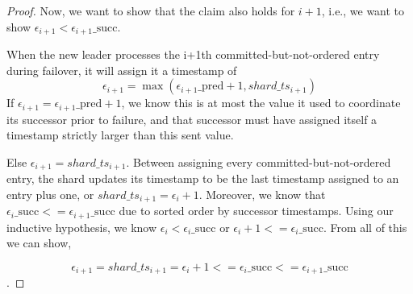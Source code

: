 \begin{proof}
Now, we want to show that the claim also holds for $i+1$, i.e., we want to show $\epsilon_{i+1} < \epsilon_{i+1}\_\text{succ}$.

When the new leader processes the i+1th committed-but-not-ordered entry during failover, it will assign it a timestamp of
$$\epsilon_{i+1} = \max(\epsilon_{i+1}\_\text{pred} + 1, shard\_ts_{i+1})$$
If $\epsilon_{i+1} = \epsilon_{i+1}\_\text{pred} + 1$, we know this is at most the value it used to coordinate its successor prior to failure, and that successor must have assigned itself a timestamp strictly larger than this sent value.

Else $\epsilon_{i+1} = shard\_ts_{i+1}$. Between assigning every committed-but-not-ordered entry, the shard updates its timestamp to be the last timestamp assigned to an entry plus one, or $shard\_ts_{i+1} = \epsilon_i + 1$. Moreover, we know that $\epsilon_{i}\_\text{succ} <= \epsilon_{i+1}\_\text{succ}$ due to sorted order by successor timestamps. Using our inductive hypothesis, we know $\epsilon_i < \epsilon_i\_\text{succ}$ or $\epsilon_i + 1 <= \epsilon_i\_\text{succ}$. From all of this we can show,

$$\epsilon_{i+1} = shard\_ts_{i+1} = \epsilon_i + 1 <= \epsilon_i\_\text{succ} <= \epsilon_{i+1}\_\text{succ}$$.



\end{proof}

